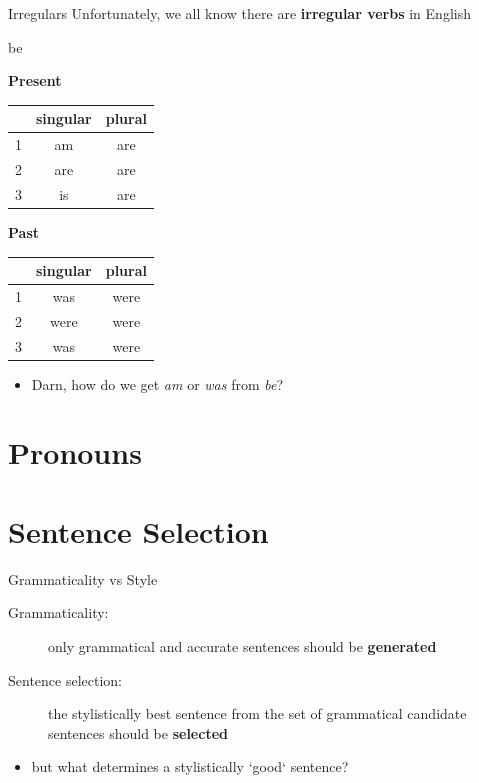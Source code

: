 \documentclass[10pt, compress]{beamer}
\begin{document}
\begin{frame}{Irregulars}
	Unfortunately, we all know there are {\bf irregular verbs} in English

	\begin{table}
		{\sc be} \\
		\begin{multicols}{2}

			{\bf Present}	\\
			\begin{tabular}{|r|cc|}
				\toprule
					&	singular	&	plural	\\
				\midrule
				1	&	am 	&	are 	\\	
				2	&	are 	&	are 	\\
				3	&	is &	are 	\\
				\bottomrule
			\end{tabular}

			{\bf Past}	\\
			\begin{tabular}{|r|cc|}
				\toprule
					&	singular	&	plural	\\
				\midrule
				1	&	was 	&	were 	\\	
				2	&	were 	&	were 	\\
				3	&	was &	were 	\\
				\bottomrule
			\end{tabular}
		\end{multicols}
	\end{table}

	\pause

	\begin{itemize}
		\item Darn, how do we get \emph{am} or \emph{was} from \emph{be}?
	\end{itemize}

\end{frame}


\section{Pronouns}


\section{Sentence Selection}
\begin{frame}{Grammaticality vs Style}
    \begin{description}
        \item[Grammaticality:] only grammatical and accurate sentences should be {\bf generated}
        \item[Sentence selection:] the stylistically best sentence from the set of grammatical candidate sentences should be {\bf selected} \pause
    \end{description}
    \begin{itemize}
        \item but what determines a stylistically `good` sentence?
    \end{itemize}
    
\end{frame}
\end{document}
